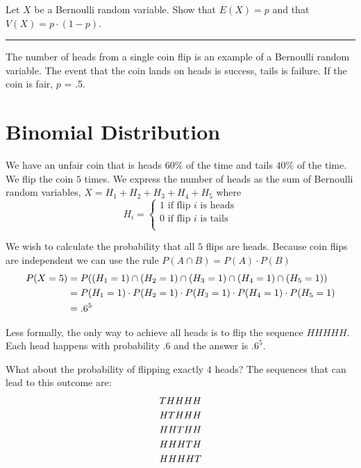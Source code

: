 \documentclass[
]{book}
\theoremstyle{definition}
\theoremstyle{definition}
\theoremstyle{definition}
\theoremstyle{remark}
\let\BeginKnitrBlock\begin \let\EndKnitrBlock\end
\begin{document}
\BeginKnitrBlock{exercise}
\protect\hypertarget{exr:bernoulliexr}{}{\label{exr:bernoulliexr} }Let \(X\) be a Bernoulli random variable. Show that \(E(X)=p\) and that \(V(X)=p \cdot (1-p)\).
\EndKnitrBlock{exercise}

\begin{center}\rule{0.5\linewidth}{0.5pt}\end{center}

The number of heads from a single coin flip is an example of a Bernoulli random variable. The event that the coin lands on heads is success, tails is failure. If the coin is fair, \(p\) = .5.

\hypertarget{binomial-distribution}{%
\section{Binomial Distribution}\label{binomial-distribution}}

We have an unfair coin that is heads \(60\%\) of the time and tails \(40\%\) of the time. We flip the coin \(5\) times. We express the number of heads as the sum of Bernoulli random variables, \(X = H_1 + H_2 + H_3 + H_4 + H_5\) where
\begin{equation*} 
    H_i =
    \left\{
        \begin{array}{cc}
                1 \text{ if flip } i \text{ is heads} \\
                0 \text{ if flip } i \text{ is tails} \\
        \end{array} 
    \right.
\end{equation*}

We wish to calculate the probability that all \(5\) flips are heads. Because coin flips are independent we can use the rule \(P(A \cap B) = P(A) \cdot P(B)\)
\begin{align} 
P(X=5) &= P((H_1=1) \cap (H_2=1) \cap (H_3=1) \cap (H_4=1) \cap (H_5=1)) \notag \\
&=P(H_1=1) \cdot P(H_2=1) \cdot P(H_3=1) \cdot P(H_4=1) \cdot P(H_5=1)  \notag \\
&= .6^5 \notag
\end{align}

Less formally, the only way to achieve all heads is to flip the sequence \(HHHHH\). Each head happens with probability \(.6\) and the answer is \(.6^5\).

What about the probability of flipping exactly \(4\) heads? The sequences that can lead to this outcome are:
\begin{align} 
THHHH \notag \\
HTHHH  \notag \\
HHTHH \notag \\
HHHTH \notag \\
HHHHT \notag
\end{align}
\end{document}
